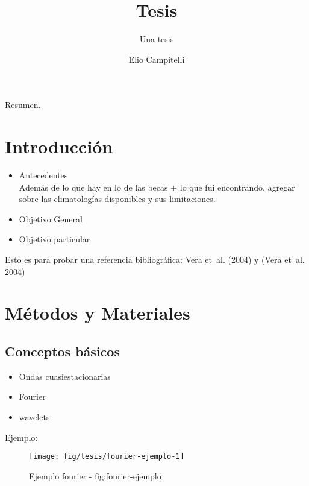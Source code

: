 \documentclass[spanish,a4paper]{book}
\title{Tesis}
\subtitle{Una tesis}
\author{Elio Campitelli}
\date{}
\providecommand{\tightlist}{%
  \setlength{\itemsep}{0pt}\setlength{\parskip}{0pt}}
\begin{document}
\maketitle

{
\setcounter{tocdepth}{3}
\tableofcontents
}
Resumen.


\chapter{Introducción}\label{introduccion}

\begin{itemize}
\tightlist
\item
  Antecedentes\\
  Además de lo que hay en lo de las becas + lo que fui encontrando,
  agregar sobre las climatologías disponibles y sus limitaciones.
\item
  Objetivo General
\item
  Objetivo particular
\end{itemize}

Esto es para probar una referencia bibliográfica: Vera et~al.
(\protect\hyperlink{ref-Vera2004}{2004}) y (Vera et~al.
\protect\hyperlink{ref-Vera2004}{2004})

\chapter{Métodos y Materiales}\label{metodos-y-materiales}


\section{Conceptos básicos}\label{conceptos-basicos}

\begin{itemize}
\tightlist
\item
  Ondas cuasiestacionarias
\item
  Fourier
\item
  wavelets
\end{itemize}


Ejemplo:

\begin{figure*}
\texttt{[image: fig/tesis/fourier-ejemplo-1]} \caption{Ejemplo fourier - fig:fourier-ejemplo}\label{fig:fourier-ejemplo}
\end{figure*}
\end{document}
